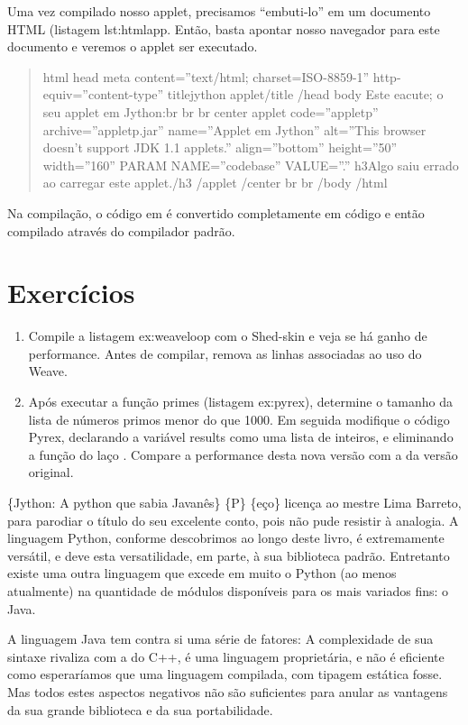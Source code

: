 \documentclass[a4paper,10pt,brazil]{sphinxmanual}
\begin{document}
Uma vez compilado nosso applet, precisamos ``embuti-lo'' em um
documento HTML (listagem lst:htmlapp. Então, basta apontar nosso
navegador para este documento e veremos o applet ser executado.
\begin{quote}

html head meta content=''text/html; charset=ISO-8859-1''
http-equiv=''content-type'' titlejython applet/title /head body Este
eacute; o seu applet em Jython:br br br center applet
code=''appletp'' archive=''appletp.jar'' name=''Applet em Jython''
alt=''This browser doesn't support JDK 1.1 applets.'' align=''bottom''
height=''50'' width=''160'' PARAM NAME=''codebase'' VALUE=''.'' h3Algo saiu
errado ao carregar este applet./h3 /applet /center br br /body
/html
\end{quote}

Na compilação, o código em  é convertido completamente em
código  e então compilado através do compilador 
padrão.


\chapter{Exercícios}
\label{capext:exercicios}\begin{enumerate}
\item {} 
Compile a listagem ex:weaveloop com o Shed-skin e veja se há ganho
de performance. Antes de compilar, remova as linhas associadas ao
uso do Weave.

\item {} 
Após executar a função primes (listagem ex:pyrex), determine o
tamanho da lista de números primos menor do que 1000. Em seguida
modifique o código Pyrex, declarando a variável results como uma
lista de inteiros, e eliminando a função  do laço
. Compare a performance desta nova versão com a da versão
original.

\end{enumerate}

\{Jython: A python que sabia Javanês\} \{P\} \{eço\} licença ao mestre
Lima Barreto, para parodiar o título do seu excelente conto, pois
não pude resistir à analogia. A linguagem Python, conforme
descobrimos ao longo deste livro, é extremamente versátil, e deve
esta versatilidade, em parte, à sua biblioteca padrão. Entretanto
existe uma outra linguagem que excede em muito o Python (ao menos
atualmente) na quantidade de módulos disponíveis para os mais
variados fins: o Java.

A linguagem Java tem contra si uma série de fatores: A complexidade
de sua sintaxe rivaliza com a do C++, é uma linguagem proprietária,
e não é eficiente como esperaríamos que uma linguagem compilada,
com tipagem estática fosse. Mas todos estes aspectos negativos não
são suficientes para anular as vantagens da sua grande biblioteca e
da sua portabilidade.
\end{document}

